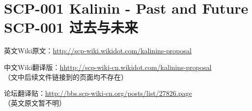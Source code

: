 \chapter[SCP-001 过去与未来]{
	SCP-001 Kalinin - Past and Future \\
	SCP-001 过去与未来
}

\label{chap:SCP-001.past.and.future}


\hr


\begin{scpbox}

英文Wiki原文：\url{http://scp-wiki.wikidot.com/kalinins-proposal}

中文Wiki翻译版：\url{hhttp://scp-wiki-cn.wikidot.com/kalinins-proposal} \\
（文中后续文件链接到的页面均不存在）

论坛翻译贴：\url{http://bbs.scp-wiki-cn.org/posts/list/27826.page} \\
（英文原文暂不明）

\end{scpbox}
